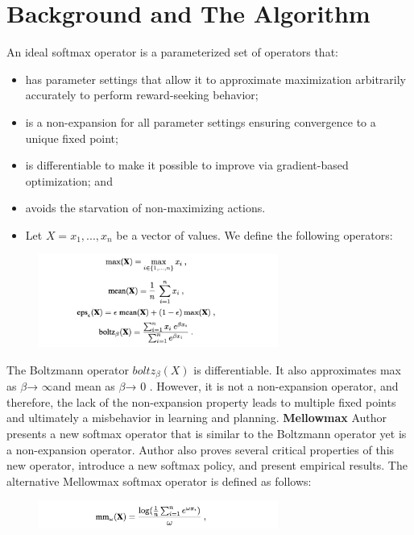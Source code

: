 \section{Background and The Algorithm}
\label{section:algorithm}
An ideal softmax operator is a parameterized set of operators that:
\begin{itemize}
\item has parameter settings that allow it to approximate maximization arbitrarily accurately to perform reward-seeking behavior;
\item is a non-expansion for all parameter settings ensuring convergence to a unique fixed point;
\item is differentiable to make it possible to improve via gradient-based optimization; and
\item avoids the starvation of non-maximizing actions.
\item Let $X = x_{1},...,x_{n}$ be a vector of values. We define the following operators:
\end{itemize}


\begin{figure}[htbp]
\centering
\includegraphics[width=0.7\textwidth]{algorithm2.png}
\end{figure}
The Boltzmann operator $boltz_{\beta}(X)$ is differentiable. It also approximates max as $\beta $→ $\infty$and mean as $\beta $→ $0$ . However, it is not a non-expansion operator, and therefore, the lack of the non-expansion property leads to multiple fixed points and ultimately a misbehavior in learning and planning.
\newpage
\textbf{Mellowmax}
\newline\newline
Author presents a new softmax operator that is similar to the Boltzmann operator yet is a non-expansion operator. Author also proves several critical properties of this new operator, introduce a new softmax policy, and present empirical results. The alternative Mellowmax softmax operator is defined as follows:

\begin{figure}[htbp]
\centering
\includegraphics[width=0.7\textwidth]{mel2.png}
\end{figure}

